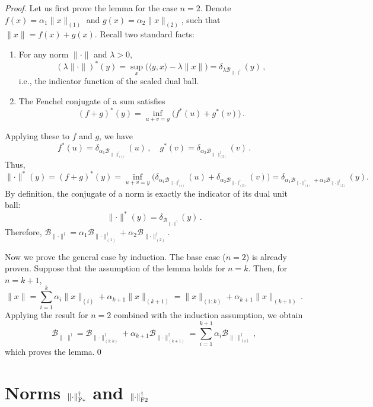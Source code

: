 \documentclass[smallextended,referee,envcountsect]{svjour3}
\newcommand{\cB}{\mathcal{B}}
\newcommand{\norm}[1]{\lVert #1\rVert}
\DeclarePairedDelimiter{\normfstar}{\|}{\|_\mathrm{F*}}
\DeclarePairedDelimiter{\normftwo}{\|}{\|_\mathrm{F2}}
\begin{document}
 \begin{proof}
   Let us first prove the lemma for the case $n = 2$. Denote $f(x) = \alpha_1 \norm{x}_{(1)}$ and $g(x) = \alpha_2 \norm{x}_{(2)}$, such that $\norm{x} = f(x) + g(x)$. Recall two standard facts:
   \begin{enumerate}
     \item For any norm $\norm{\cdot}$ and $\lambda>0$,
           \[
             (\lambda \norm{\cdot})^*(y) =
             \sup_{x}\bigl( \langle y,x \rangle - \lambda \norm{x}\bigr)
             = \delta_{\lambda \cB_{\norm{\cdot}^\dagger}}(y)\,,
           \]
           i.e., the indicator function of the scaled dual ball.
     \item The Fenchel conjugate of a sum satisfies
           \[
             (f+g)^*(y) = \inf_{u+v=y} \bigl(f^*(u) + g^*(v)\bigr)\,.
           \]
   \end{enumerate}
   Applying these to $f$ and $g$, we have
   \[
     f^*(u) = \delta_{\alpha_1 \cB_{\norm{\cdot}_{(1)}^\dagger}}(u)\,,
     \quad
     g^*(v) = \delta_{\alpha_2 \cB_{\norm{\cdot}_{(2)}^\dagger}}(v)\,.
   \]
   Thus,
   \[
     \norm{\cdot}^*(y)
     = (f+g)^*(y)
     = \inf_{u+v=y}
     \bigl(
     \delta_{\alpha_1 \cB_{\norm{\cdot}_{(1)}^\dagger}}(u)
     +
     \delta_{\alpha_2 \cB_{\norm{\cdot}_{(2)}^\dagger}}(v)
     \bigr)
     =
     \delta_{\alpha_1 \cB_{\norm{\cdot}_{(1)}^\dagger}+\alpha_2 \cB_{\norm{\cdot}_{(2)}^\dagger}}(y).
   \]
   By definition, the conjugate of a norm is exactly the indicator of its dual unit ball:
   \[
   \norm{\cdot}^*(y) = \delta_{\cB_{\norm{\cdot}^\dagger}}(y)\,.
   \]
   Therefore, $\cB_{\norm{\cdot}^\dagger} = \alpha_1 \cB_{\norm{\cdot}_{(1)}^\dagger} + \alpha_2 \cB_{\norm{\cdot}_{(2)}^\dagger}$.
 
   Now we prove the general case by induction. The base case ($n=2$) is already proven. Suppose that the assumption of the lemma holds for $n = k$. Then, for $n = k + 1$,
   \[
   \norm{x} = \sum_{i = 1}^k \alpha_i \norm{x}_{(i)} + \alpha_{k + 1}\norm{x}_{(k + 1)} = \norm{x}_{(1:k)} + \alpha_{k + 1}\norm{x}_{(k + 1)}\,.
   \]
   Applying the result for $n=2$ combined with the induction assumption, we obtain
   \[
   \cB_{\norm{\cdot}^\dagger} = \cB_{\norm{\cdot}_{(1:k)}^\dagger} + \alpha_{k + 1} \cB_{\norm{\cdot}_{(k + 1)}^\dagger} = \sum_{i = 1}^{k + 1} \alpha_i \cB_{\norm{\cdot}_{(i)}^\dagger}\,,
   \]
   which proves the lemma.\qed
\end{proof}
 
 \section[Norms for F-Muon and F-Neon]%
         {Norms $\normfstar{\cdot}^\dagger$ and $\normftwo{\cdot}^\dagger$}
 \label{sec:f2_fstar_norms}
 
\end{document}
